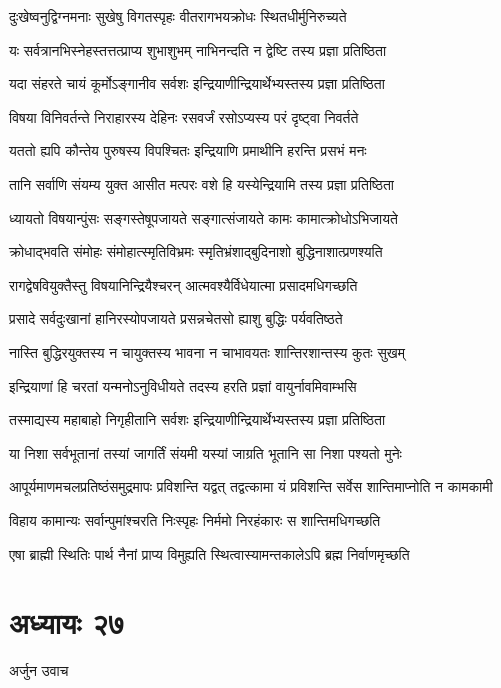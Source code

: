 \twolineshloka
{दुःखेष्वनुद्विग्नमनाः सुखेषु विगतस्पृहः}
{वीतरागभयक्रोधः स्थितधीर्मुनिरुच्यते}


\twolineshloka
{यः सर्वत्रानभिस्नेहस्तत्तत्प्राप्य शुभाशुभम्}
{नाभिनन्दति न द्वेष्टि तस्य प्रज्ञा प्रतिष्ठिता}


\twolineshloka
{यदा संहरते चायं कूर्मोऽङ्गानीव सर्वशः}
{इन्द्रियाणीन्द्रियार्थेभ्यस्तस्य प्रज्ञा प्रतिष्ठिता}


\twolineshloka
{विषया विनिवर्तन्ते निराहारस्य देहिनः}
{रसवर्जं रसोऽप्यस्य परं दृष्ट्वा निवर्तते}


\twolineshloka
{यततो ह्यपि कौन्तेय पुरुषस्य विपश्चितः}
{इन्द्रियाणि प्रमाथीनि हरन्ति प्रसभं मनः}


\twolineshloka
{तानि सर्वाणि संयम्य युक्त आसीत मत्परः}
{वशे हि यस्येन्द्रियामि तस्य प्रज्ञा प्रतिष्ठिता}


\twolineshloka
{ध्यायतो विषयान्पुंसः सङ्गस्तेषूपजायते}
{सङ्गात्संजायते कामः कामात्क्रोधोऽभिजायते}


\twolineshloka
{क्रोधाद्भवति संमोहः संमोहात्स्मृतिविभ्रमः}
{स्मृतिभ्रंशाद्बुदिनाशो बुद्धिनाशात्प्रणश्यति}


\twolineshloka
{रागद्वेषवियुक्तैस्तु विषयानिन्द्रियैश्चरन्}
{आत्मवश्यैर्विधेयात्मा प्रसादमधिगच्छति}


\twolineshloka
{प्रसादे सर्वदुःखानां हानिरस्योपजायते}
{प्रसन्नचेतसो ह्याशु बुद्धिः पर्यवतिष्ठते}


\twolineshloka
{नास्ति बुद्धिरयुक्तस्य न चायुक्तस्य भावना}
{न चाभावयतः शान्तिरशान्तस्य कुतः सुखम्}


\twolineshloka
{इन्द्रियाणां हि चरतां यन्मनोऽनुविधीयते}
{तदस्य हरति प्रज्ञां वायुर्नावमिवाम्भसि}


\twolineshloka
{तस्माद्यस्य महाबाहो निगृहीतानि सर्वशः}
{इन्द्रियाणीन्द्रियार्थेभ्यस्तस्य प्रज्ञा प्रतिष्ठिता}


\twolineshloka
{या निशा सर्वभूतानां तस्यां जागर्तिं संयमी}
{यस्यां जाग्रति भूतानि सा निशा पश्यतो मुनेः}


\twolineshloka
{आपूर्यमाणमचलप्रतिष्ठंसमुद्रमापः प्रविशन्ति यद्वत्}
{तद्वत्कामा यं प्रविशन्ति सर्वेस शान्तिमाप्नोति न कामकामी}


\twolineshloka
{विहाय कामान्यः सर्वान्पुमांश्चरति निःस्पृहः}
{निर्ममो निरहंकारः स शान्तिमधिगच्छति}


\twolineshloka
{एषा ब्राह्मी स्थितिः पार्थ नैनां प्राप्य विमुह्यति}
{स्थित्वास्यामन्तकालेऽपि ब्रह्म निर्वाणमृच्छति}


\chapter{अध्यायः २७}
\twolineshloka
{अर्जुन उवाच}
{}


